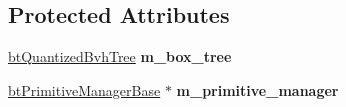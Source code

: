 \subsection*{Protected Attributes}
\begin{DoxyCompactItemize}
\item 
\mbox{\label{classbtGImpactQuantizedBvh_a617f9be0d5faddadabd3b304ab596d96}} 
\hyperlink{classbtQuantizedBvhTree}{bt\+Quantized\+Bvh\+Tree} {\bfseries m\+\_\+box\+\_\+tree}
\item 
\mbox{\label{classbtGImpactQuantizedBvh_a45f776d1563c72c522679ca28cec2fea}} 
\hyperlink{classbtPrimitiveManagerBase}{bt\+Primitive\+Manager\+Base} $\ast$ {\bfseries m\+\_\+primitive\+\_\+manager}
\end{DoxyCompactItemize}
